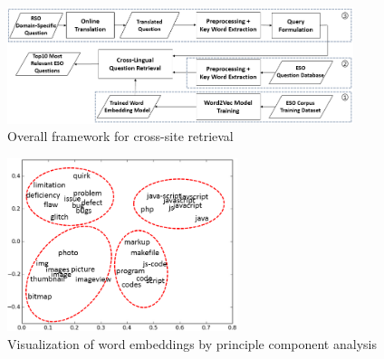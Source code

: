 
\begin{figure}
	\centering
	\includegraphics[width = 0.9\textwidth]{figures/workflow.png}
	\caption{Overall framework for cross-site retrieval}
	\centering
	\label{fig:flowChart}
\end{figure}

\begin{figure}
	\centering
	\includegraphics[width = 0.6\textwidth]{figures/PCAplot.png}
	\caption{Visualization of word embeddings by principle component analysis~\cite{jolliffe1986principal}}
	\centering
	\label{fig:PCAimg}
\end{figure}

